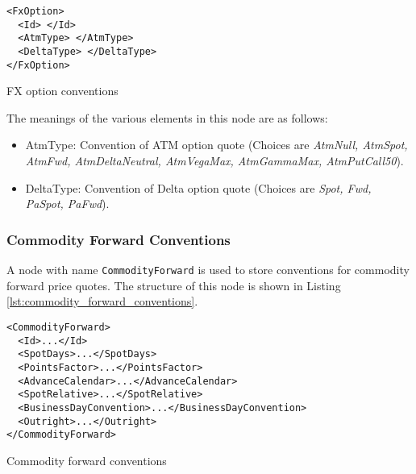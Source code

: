 \begin{listing}[H] 
\begin{verbatim} 
<FxOption> 
  <Id> </Id> 
  <AtmType> </AtmType> 
  <DeltaType> </DeltaType> 
</FxOption> 
\end{verbatim} 
\caption{FX option conventions} 
\label{lst:fx_option_conventions} 
\end{listing} 
 
 
The meanings of the various elements in this node are as follows: 
\begin{itemize} 
\item AtmType: Convention of ATM option quote (Choices are {\em AtmNull, AtmSpot, AtmFwd, 
AtmDeltaNeutral, AtmVegaMax, AtmGammaMax, AtmPutCall50}). 
\item DeltaType: Convention of Delta option quote (Choices are {\em Spot, Fwd, PaSpot, 
PaFwd}). 
\end{itemize} 

\subsubsection{Commodity Forward Conventions}
A node with name \lstinline!CommodityForward! is used to store conventions for commodity forward price quotes. The
structure of this node is shown in Listing \ref{lst:commodity_forward_conventions}.

\begin{listing}[H]
\begin{verbatim}
<CommodityForward>
  <Id>...</Id>
  <SpotDays>...</SpotDays>
  <PointsFactor>...</PointsFactor>
  <AdvanceCalendar>...</AdvanceCalendar>
  <SpotRelative>...</SpotRelative>
  <BusinessDayConvention>...</BusinessDayConvention>
  <Outright>...</Outright>
</CommodityForward>
\end{verbatim}
\caption{Commodity forward conventions}
\label{lst:commodity_forward_conventions}
\end{listing}

